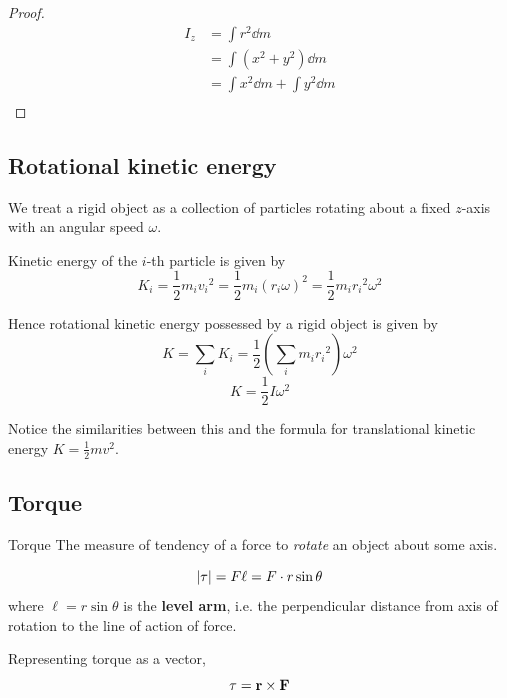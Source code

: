 \begin{proof}
\begin{align*}
I_z &= \int r^2 \dd{m} \\
&= \int (x^2+y^2) \dd{m} \\
&= \int x^2 \dd{m} + \int y^2 \dd{m} \\
\end{align*}
\end{proof}
\pagebreak

\subsection{Rotational kinetic energy}
We treat a rigid object as a collection of particles rotating about a fixed $z$-axis with an angular speed $\omega$.

Kinetic energy of the $i$-th particle is given by 
\[ K_i = \frac{1}{2} m_i {v_i}^2 = \frac{1}{2} m_i (r_i \omega)^2 = \frac{1}{2} m_i {r_i}^2 \omega^2 \]

Hence rotational kinetic energy possessed by a rigid object is given by 
\[ K = \sum_i K_i = \frac{1}{2}\left( \sum_i m_i {r_i}^2 \right) \omega^2 \]
\begin{equation}
K = \frac{1}{2} I \omega^2
\end{equation}

\begin{remark}
Notice the similarities between this and the formula for translational kinetic energy $K=\frac{1}{2}mv^2$.
\end{remark}
\pagebreak

\subsection{Torque}
\begin{defn}{Torque}{}
The measure of tendency of a force to \emph{rotate} an object about some axis.
\end{defn}

\begin{equation}
|\vb{\tau}| = F\ell = F\cdot r\sin\theta
\end{equation}
where $\ell = r\sin\theta$ is the \textbf{level arm}, i.e. the perpendicular distance from axis of rotation to the line of action of force.

Representing torque as a vector,
\begin{equation}
\mathbf{\tau} = \vb{r} \times \vb{F}
\end{equation}


